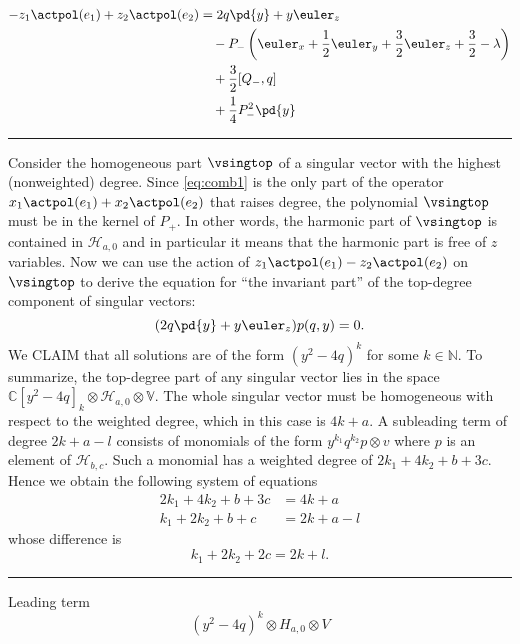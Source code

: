 \begin{appendices}
\begin{align}
-z_1 \actpol(e_1) + z_2 \actpol(e_2) &= 2q\pd{y} + y \euler_z \\
        & \quad -P_-\left( \euler_x + \frac{1}{2}\euler_y  + \frac{3}{2}\euler_z + \frac{3}{2} - \lambda \right)\\
        & \quad +\frac{3}{2}[Q_-, q] \\
        & \quad +\frac{1}{4}P_-^2 \pd{y}
\end{align}

\bigskip
\hrule
\bigskip

Consider the homogeneous part $\vsingtop$ of a singular vector with the highest (nonweighted) degree. Since \eqref{eq:comb1} is the only part of the operator $x_1\actpol(e_1) + x_2\actpol(e_2)$ that raises degree, the polynomial $\vsingtop$ must be in the kernel of $P_+$. In other words, the harmonic part of $\vsingtop$ is contained in $\mathcal{H}_{a,0}$ and in particular it means that the harmonic part is free of $z$ variables. Now we can use the action of $z_1\actpol(e_1) - z_2\actpol(e_2)$ on $\vsingtop$ to derive the equation for ``the invariant part'' of the top-degree component of singular vectors:
\[
(2q\pd{y} + y\euler_z) p(q,y) = 0.
\]%
We CLAIM that all solutions are of the form $(y^2 - 4q)^k$ for some $k\in\mathbb{N}$. To summarize, the top-degree part of any singular vector lies in the space $\mathbb{C}[y^2 - 4q]_k \otimes \mathcal{H}_{a,0} \otimes \mathbb{V}$. The whole singular vector must be homogeneous with respect to the weighted degree, which in this case is $4k + a$. A subleading term of degree $2k + a - l$ consists of monomials of the form $y^{k_1}q^{k_2} p \otimes v$ where $p$ is an element of $\mathcal{H}_{b,c}$. Such a monomial has a weighted degree of $2k_1 + 4k_2 + b + 3c$. Hence we obtain the following system of equations
\begin{align}
 2k_1 + 4k_2 + b + 3c & = 4k + a \\
  k_1 + 2k_2 + b +  c & = 2k + a - l
\end{align}
whose difference is
\[
k_1 + 2k_2 + 2c = 2k + l.
\]

\bigskip
\hrule
\pagebreak
\bigskip

Leading term
\[
    (y^2-4q)^k \otimes H_{a,0} \otimes V
\]


\end{appendices}
